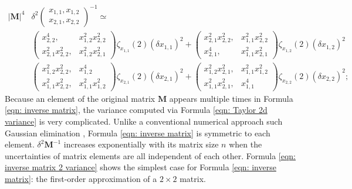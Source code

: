 \documentclass[twoside]{article}
\numberwithin{equation}{section}
\begin{document}
\begin{align}
\label{eqn: inverse matrix 2 variance}
|\mathbf{M}|^4 &\delta^2 \left( \begin{matrix} x_{1,1}, x_{1,2} \\ x_{2,1}, x_{2,2} \end{matrix} \right)^{-1} \simeq\;  \\
	 &\left( \begin{matrix} x_{2,2}^4, &x_{1,2}^2 x_{2,2}^2 \\ x_{2,1}^2 x_{2,2}^2, &x_{1,2}^2 x_{2,1}^2 \end{matrix} \right) \zeta_{x_{1,1}}(2) (\delta x_{1,1})^2 
	 +\left( \begin{matrix} x_{2,1}^2 x_{2,2}^2, &x_{1,1}^2 x_{2,2}^2 \\ x_{2,1}^4, &x_{1,1}^2 x_{2,1}^2 \end{matrix} \right)\zeta_{x_{1,2}}(2)  (\delta x_{1,2})^2\nonumber \\
	&\left( \begin{matrix} x_{1,2}^2 x_{2,2}^2, &x_{1,2}^4 \\ x_{1,1}^2 x_{2,2}^2, &x_{1,1}^2 x_{1,2}^2 \end{matrix} \right) \zeta_{x_{2,1}}(2) (\delta x_{2,1})^2
	 +\left( \begin{matrix} x_{1,2}^2 x_{2,1}^2, &x_{1,1}^2 x_{1,2}^2 \\ x_{1,1}^2 x_{2,1}^2, &x_{1,1}^4 \end{matrix} \right) \zeta_{x_{2,2}}(2) (\delta x_{2,2})^2; \nonumber
\end{align}
Because an element of the original matrix $\mathbf{M}$ appears multiple times in Formula \eqref{eqn: inverse matrix}, the variance computed via Formula \eqref{eqn: Taylor 2d variance} is very complicated. 
Unlike a conventional numerical approach such Gaussian elimination \cite{Numerical_Recipes}, Formula \eqref{eqn: inverse matrix} is symmetric to each element.
$\delta^2 \mathbf{M}^{-1}$ increases exponentially with its matrix size $n$ when the uncertainties of matrix elements are all independent of each other.
Formula \eqref{eqn: inverse matrix 2 variance} shows the simplest case for Formula \eqref{eqn: inverse matrix}: the first-order approximation of a $2 \times 2$ matrix.
\end{document}
